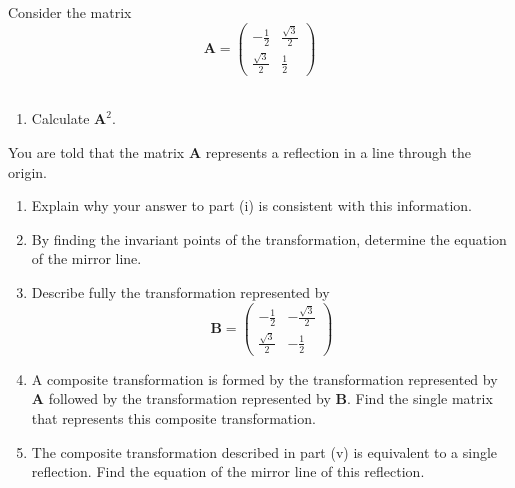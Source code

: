 \documentclass[leqno]{article}
\begin{document}
\begin{enumerate}[
  label=\textbf{\arabic*.},
  leftmargin=*,
  topsep=0pt,
  partopsep=0pt,
  parsep=0pt
]
\newpage

\questionitem

Consider the matrix
\[
\mathbf{A}=\begin{pmatrix}
-\frac{1}{2} & \frac{\sqrt{3}}{2}\\[6pt]
\frac{\sqrt{3}}{2} & \frac{1}{2}
\end{pmatrix}
\] \\

\begin{enumerate}[label=\textbf{(\roman*)}]
  \item Calculate $\mathbf{A}^2$.  \\
\end{enumerate}

You are told that the matrix $\mathbf{A}$ represents a reflection in a line through the origin. \\

\begin{enumerate}[label=\textbf{(\roman*)}, resume]
  \item Explain why your answer to part (i) is consistent with this information.  \\
  \item By finding the invariant points of the transformation, determine the equation of the mirror line.  \\
  \item Describe fully the transformation represented by
  \[
  \mathbf{B}=\begin{pmatrix}
  -\frac{1}{2} & -\frac{\sqrt{3}}{2}\\[6pt]
  \frac{\sqrt{3}}{2} & -\frac{1}{2}
  \end{pmatrix}
  \]
  \item A composite transformation is formed by the transformation represented by $\mathbf{A}$ followed by the transformation represented by $\mathbf{B}$. Find the single matrix that represents this composite transformation.  \\
  \item The composite transformation described in part (v) is equivalent to a single reflection. Find the equation of the mirror line of this reflection.  \\
\end{enumerate}

\newpage

\questionitem


\end{enumerate}
\end{document}
